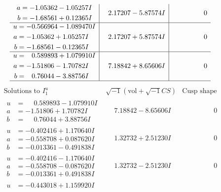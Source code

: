 \documentclass[1p]{elsarticle_modified}
\theoremstyle{definition}
\newcommand{\I}{\sqrt{-1}}
\begin{document}
$$\begin{array}{c|c|c}
\begin{aligned}
a &= -1.05362 - 1.05257 I \\
b &= -1.68561 + 0.12365 I\end{aligned}
 & \phantom{-}2.17207 - 5.87574 I & \phantom{-0.000000 } 0 \\ \hline\begin{aligned}
u &= -0.566964 - 1.089470 I \\
a &= -1.05362 + 1.05257 I \\
b &= -1.68561 - 0.12365 I\end{aligned}
 & \phantom{-}2.17207 + 5.87574 I & \phantom{-0.000000 } 0 \\ \hline\begin{aligned}
u &= \phantom{-}0.589893 + 1.079910 I \\
a &= -1.51806 - 1.70782 I \\
b &= \phantom{-}0.76044 - 3.88756 I\end{aligned}
 & \phantom{-}7.18842 + 8.65606 I & \phantom{-0.000000 } 0\\
 \hline 
 \end{array}$$\newpage$$\begin{array}{c|c|c}  
\text{Solutions to }I^u_{1}& \I (\text{vol} + \sqrt{-1}CS) & \text{Cusp shape}\\
 \hline 
\begin{aligned}
u &= \phantom{-}0.589893 - 1.079910 I \\
a &= -1.51806 + 1.70782 I \\
b &= \phantom{-}0.76044 + 3.88756 I\end{aligned}
 & \phantom{-}7.18842 - 8.65606 I & \phantom{-0.000000 } 0 \\ \hline\begin{aligned}
u &= -0.402416 + 1.170640 I \\
a &= -0.558708 + 0.087620 I \\
b &= -0.013361 - 0.491838 I\end{aligned}
 & \phantom{-}1.32732 + 2.51230 I & \phantom{-0.000000 } 0 \\ \hline\begin{aligned}
u &= -0.402416 - 1.170640 I \\
a &= -0.558708 - 0.087620 I \\
b &= -0.013361 + 0.491838 I\end{aligned}
 & \phantom{-}1.32732 - 2.51230 I & \phantom{-0.000000 } 0 \\ \hline\begin{aligned}
u &= -0.443018 + 1.159920 I \\

\end{aligned}
\end{array}$$
\end{document}
